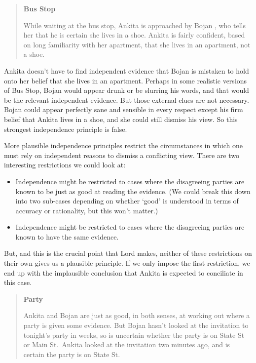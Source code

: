 \documentclass[
  10pt,
  letterpaper,
  twoside]{scrbook}
\providecommand{\tightlist}{%
  \setlength{\itemsep}{0pt}\setlength{\parskip}{0pt}}\usepackage{longtable,booktabs,array}
\begin{document}
\begin{quote}
\textbf{Bus Stop}

While waiting at the bus stop, {Ankita} is approached by {Bojan} , who
tells her that he is certain she lives in a shoe. {Ankita} is fairly
confident, based on long familiarity with her apartment, that she lives
in an apartment, not a shoe.
\end{quote}

{Ankita} doesn't have to find independent evidence that {Bojan} is
mistaken to hold onto her belief that she lives in an apartment. Perhaps
in some realistic versions of Bus Stop, {Bojan} would appear drunk or be
slurring his words, and that would be the relevant independent evidence.
But those external clues are not necessary. {Bojan} could appear
perfectly sane and sensible in every respect except his firm belief that
{Ankita} lives in a shoe, and she could still dismiss his view. So this
strongest independence principle is false.

More plausible independence principles restrict the circumstances in
which one must rely on independent reasons to dismiss a conflicting
view. There are two interesting restrictions we could look at:

\begin{itemize}
\tightlist
\item
  Independence might be restricted to cases where the disagreeing
  parties are known to be just as good at reading the evidence. (We
  could break this down into two sub-cases depending on whether `good'
  is understood in terms of accuracy or rationality, but this won't
  matter.)
\item
  Independence might be restricted to cases where the disagreeing
  parties are known to have the same evidence.
\end{itemize}

But, and this is the crucial point that Lord makes, neither of these
restrictions on their own gives us a plausible principle. If we only
impose the first restriction, we end up with the implausible conclusion
that {Ankita} is expected to conciliate in this case.

\begin{quote}
\textbf{Party}

{Ankita} and {Bojan} are just as good, in both senses, at working out
where a party is given some evidence. But {Bojan} hasn't looked at the
invitation to tonight's party in weeks, so is uncertain whether the
party is on State St or Main St.~{Ankita} looked at the invitation two
minutes ago, and is certain the party is on State St.
\end{quote}
\end{document}
